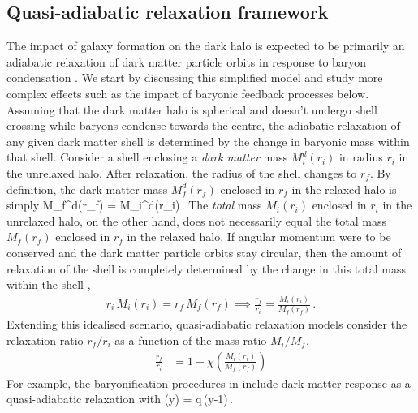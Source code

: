 \subsection{Quasi-adiabatic relaxation framework}
\label{sec:methods-adiab-ch:sims}
The impact of galaxy formation on the dark halo is expected to be primarily an adiabatic relaxation of dark matter particle orbits in response to baryon condensation \citep[][]{1986ApJ...301...27B}. We start by discussing this simplified model and study more complex effects such as the impact of baryonic feedback processes below.
Assuming that the dark matter halo is spherical and doesn't undergo shell crossing while baryons condense towards the centre, the adiabatic relaxation of any given dark matter shell is determined by the change in baryonic mass within that shell. 
Consider a shell enclosing a \emph{dark matter} mass $M_i^d(r_i)$ in radius $r_i$ in the unrelaxed halo. After relaxation, the radius of the shell changes to $r_f$. By definition, the dark matter mass $M_f^d(r_f)$ enclosed in $r_f$ in the relaxed halo is simply
\be 
M_f^d(r_f) = M_i^d(r_i)\,.
\label{eq:DMmass1}
\ee
The \emph{total} mass $M_i(r_i)$ enclosed in $r_i$ in the unrelaxed halo, on the other hand, does not necessarily equal the total mass $M_f(r_f)$ enclosed in $r_f$ in the relaxed halo.
If angular momentum were to be conserved and the dark matter particle orbits stay circular, then the amount of relaxation of the shell is completely determined by the change in this total mass within the shell
\citep[][]{1986ApJ...301...27B},
\begin{align}
    r_i \,M_i(r_i) = r_f \,M_f(r_f) %
    \implies 
\frac{r_f}{r_i} = \frac{M_i(r_i)}{M_f(r_f)}\,. 
\label{eq:AR1}
\end{align}
Extending this idealised scenario, quasi-adiabatic relaxation models consider the relaxation ratio $r_f/r_i$ as a function of the mass ratio $M_i/M_f$.
\begin{align}
\frac{r_f}{r_i} &= 1 + \chi \left( \frac{M_i(r_i)}{M_f(r_f)} \right) 
\label{eq:qAR1}
\end{align}
For example, the baryonification procedures in \cite{2015JCAP...12..049S,2021MNRAS.503.4147P} include dark matter response as a quasi-adiabatic relaxation with
\be
\chi(y) = q\,(y-1)\,.
\label{eq:chi-linear-ch:sims}
\ee

